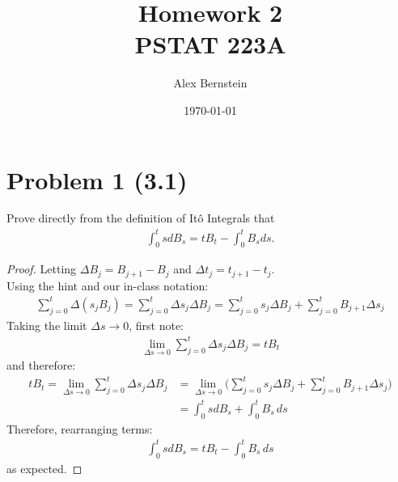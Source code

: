 \documentclass[11pt]{article}
\date{\today}
\newcommand{\Gd}{\Delta}
\renewcommand{\to}{\longrightarrow}
\begin{document}
\title{Homework 2 \\ \large PSTAT 223A \vspace{-2ex}}
\author{Alex Bernstein \vspace{-2ex}}
\maketitle
 \section*{Problem 1 (3.1)}
 Prove directly from the definition of It\^{o} Integrals that
 \begin{align*}
 \int _ { 0 } ^ { t } s d B _ { s } = t B _ { t } - \int _ { 0 } ^ { t } B _ { s } d s.
 \end{align*}
 \begin{proof}Letting $\Gd B_j= B_{j+1}-B_j$ and $\Gd t_j = t_{j+1}-t_j$.\\
 Using the hint and our in-class notation:
 \begin{align*}
 \sum_{j=0}^t \Gd(s_j B_j) = \sum_{j=0}^t \Gd s_j \Gd B_j= \sum_{j=0}^t s_j \Gd B_j + \sum_{j=0}^t B_{j+1}\Gd s_j
 \end{align*}
 Taking the limit $\Gd s \to 0$, first note:
 \begin{align*}
 \lim_{\Gd s \to 0} \sum_{j=0}^t \Gd s_j \Gd B_j = tB_t
 \end{align*}
 and therefore: 
 \begin{align*}
tB_t=\lim_{\Gd s \to 0} \sum_{j=0}^t \Gd s_j \Gd B_j &= \lim_{\Gd s \to 0}  \Big( \sum_{j=0}^t s_j \Gd B_j + \sum_{j=0}^t B_{j+1}\Gd s_j \Big)\\
 &= \int_0^t s d B_s + \int_0^t B_s \, ds
 \end{align*}
 Therefore, rearranging terms:
 \begin{align*}
 \int_0^t s d B_s = tB_t -\int_0^t B_s \, ds
 \end{align*}
 as expected.
 \end{proof}
 \newcommand{\sectionbreak}{\clearpage}
\end{document}
